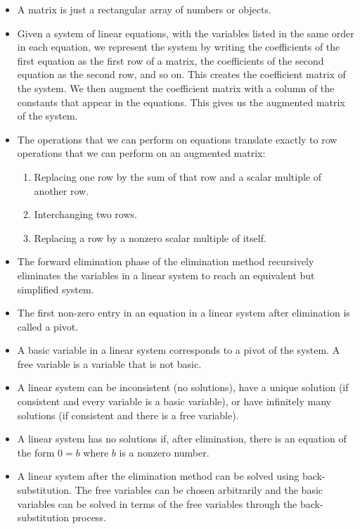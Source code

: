 
\begin{itemize}
\item A matrix is just a rectangular array of numbers or objects. 
\item Given a system of linear equations, with the variables listed in the same order in each equation, we represent the system by writing the coefficients of the first equation as the first row of a matrix, the coefficients of the second equation as the second row, and so on. This creates the coefficient matrix of the system. We then augment the coefficient matrix with a column of the constants that appear in the equations. This gives us the augmented matrix of the system. 
\item The operations that we can perform on equations translate exactly to row operations that we can perform on an augmented matrix:
\begin{enumerate}
\item Replacing one row by the sum of that row and a scalar multiple of another row.
\item Interchanging two rows.
\item Replacing a row by a nonzero scalar multiple of itself.
\end{enumerate}
\item The forward elimination phase of the elimination method recursively eliminates the variables in a linear system to reach an equivalent but simplified system.
\item The first non-zero entry in an equation in a linear system after elimination is called a pivot.
\item A basic variable in a linear system corresponds to a pivot of the system. A free variable is a variable that is not basic.
\item A linear system can be inconsistent (no solutions), have a unique solution (if consistent and every variable is a basic variable), or have infinitely many solutions (if consistent and there is a free variable).  
\item A linear system has no solutions if, after elimination, there is an equation of the form $0=b$ where $b$ is a nonzero number.
\item A linear system after the elimination method can be solved using back-substitution. The free variables can be chosen arbitrarily and the basic variables can be solved in terms of the free variables through the back-substitution process.
\end{itemize}




